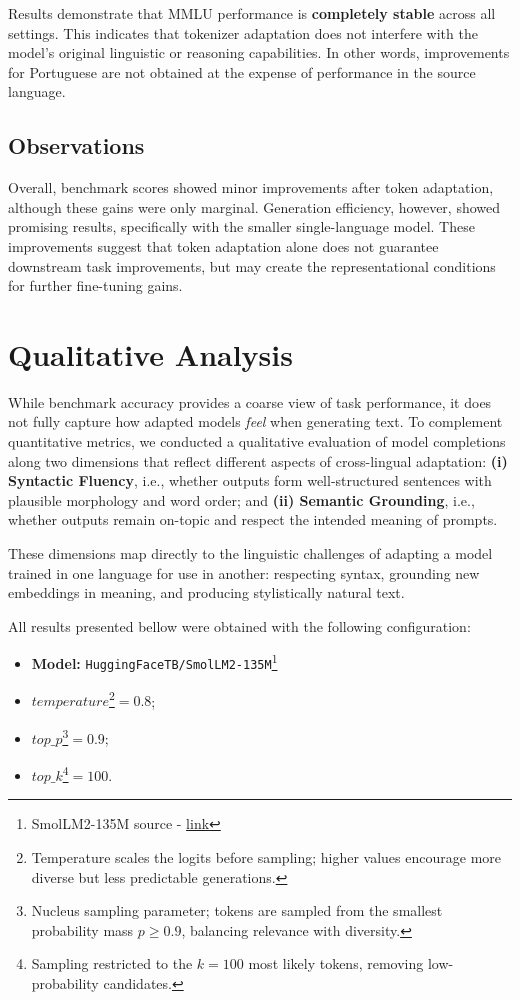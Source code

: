 Results demonstrate that MMLU performance is \textbf{completely stable} across all settings. This indicates that tokenizer adaptation does not interfere with the model’s original linguistic or reasoning capabilities. In other words, improvements for Portuguese are not obtained at the expense of performance in the source language.


\subsection{Observations}
Overall, benchmark scores showed minor improvements after token adaptation, although these gains were only marginal. Generation efficiency, however, showed promising results, specifically with the smaller single-language model. These improvements suggest that token adaptation alone does not guarantee downstream task improvements, but may create the representational conditions for further fine-tuning gains.


\section{Qualitative Analysis}

While benchmark accuracy provides a coarse view of task performance, it does not fully capture how adapted models \textit{feel} when generating text. To complement quantitative metrics, we conducted a qualitative evaluation of model completions along two dimensions that reflect different aspects of cross-lingual adaptation:  
\textbf{(i) Syntactic Fluency}, i.e., whether outputs form well-structured sentences with plausible morphology and word order; and
\textbf{(ii) Semantic Grounding}, i.e., whether outputs remain on-topic and respect the intended meaning of prompts. 

These dimensions map directly to the linguistic challenges of adapting a model trained in one language for use in another: respecting syntax, grounding new embeddings in meaning, and producing stylistically natural text.

All results presented bellow were obtained with the following configuration:
\begin{itemize}
    \item \textbf{Model: } \texttt{HuggingFaceTB/SmolLM2-135M}\footnote{SmolLM2-135M source - \href{https://huggingface.co/HuggingFaceTB/SmolLM2-135M}{link}}
    \item $temperature$\footnote{Temperature scales the logits before sampling; higher values encourage more diverse but less predictable generations.}$ = 0.8$;
    \item $top\_p$\footnote{Nucleus sampling parameter; tokens are sampled from the smallest probability mass $p \geq 0.9$, balancing relevance with diversity.}$ = 0.9$;
    \item $top\_k$\footnote{Sampling restricted to the $k=100$ most likely tokens, removing low-probability candidates.}$ = 100$.  
\end{itemize}

